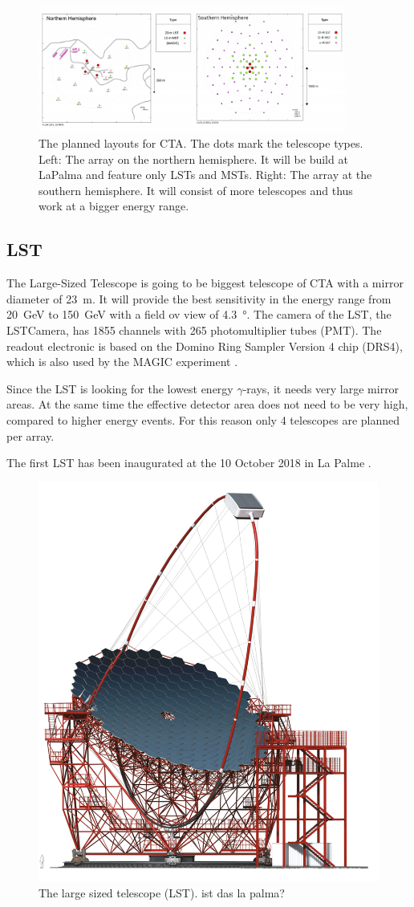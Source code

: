 \begin{figure}
	\center
	\includegraphics[width=0.9\textwidth]{images/cta_layout.png}
	\caption{The planned layouts for CTA. The dots mark the telescope types.
	Left: The array on the northern hemisphere. It will be build at LaPalma
	and feature only LSTs and MSTs.
	Right: The array at the southern hemisphere.
	It will consist of more telescopes and thus 
	work at a bigger energy range.
	\cite{cta_web}}
	\label{fig:cta_layout}
\end{figure}


\subsection{LST}
\label{sec:lst}

The Large-Sized Telescope is going to be biggest telescope of CTA
with a mirror diameter of \SI{23}{\meter}.
It will provide the best sensitivity in the energy range from 
\SI{20}{\giga\electronvolt} to \SI{150}{\giga\electronvolt} with a field ov view of \SI{4.3}{\degree}.
The camera of the LST, the LSTCamera, has \num{1855} channels 
with \num{265} photomultiplier tubes (PMT).
The readout electronic is based on the Domino Ring Sampler 
Version 4 chip (DRS4), which is also used by the MAGIC experiment
\cite{drs4 paper} \cite{drs4 at magic paper}. 

Since the LST is looking for the lowest energy $\gamma$-rays, it needs
very large mirror areas. At the same time the effective detector area does 
not need to be very high, compared to higher energy events.
For this reason only 4 telescopes are planned per array.

The first LST has been inaugurated at the 10 October 2018 in La Palme \cite{lst_debut}.

\begin{figure}
	\center
	\includegraphics[width=.5\textwidth]{images/LST.png}
	\caption{The large sized telescope (LST). ist das la palma? \cite{cta_web}}
	\label{fig:lst}
\end{figure}

